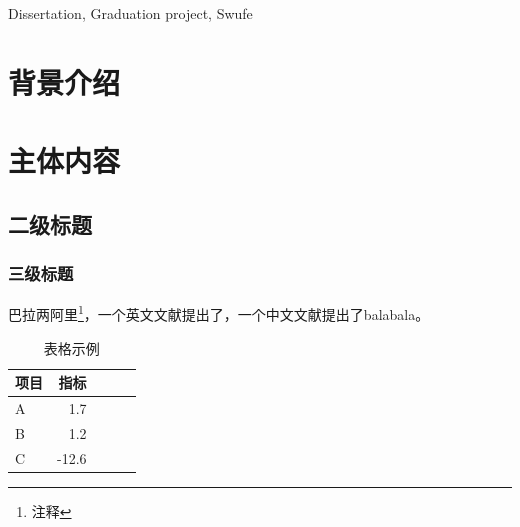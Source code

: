 \documentclass{swufethesis}
\begin{document}
\maketitle %
\statement %

\begin{abstract}{毕业论文, 毕业设计, 西南财经大学}
  \zhlipsum[1-4]
\end{abstract}

\begin{abstract*}{Dissertation, Graduation project, Swufe}
  \lipsum[1]
\end{abstract*}

\tableofcontents

\mainmatter %
\chapter{背景介绍}
\zhlipsum
\chapter{主体内容}

\section{二级标题}
\subsection{三级标题}
\zhlipsum[2-5]
巴拉两阿里\footnote{注释}，一个英文文献\cite{dirac}提出了，一个中文文献\cite{蔡敏2006--}提出了balabala。

\zhlipsum

\begin{table}[htb]
  \caption{表格示例}
  \centering
  \begin{tabular}{lrrrr}
    \toprule
    项目 & 指标  \\
    \midrule
    A    & 1.7   \\
    B    & 1.2   \\
    C    & -12.6 \\
    \bottomrule
  \end{tabular}
\end{table}

\zhlipsum
\end{document}
